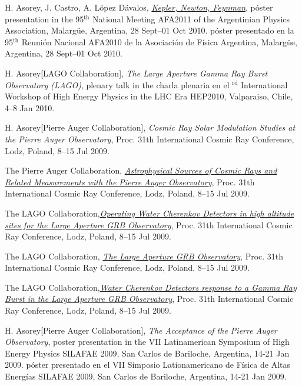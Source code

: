 \begin{etaremune}
\item {}H. Asorey, J. Castro, A. López Dávalos,
\href{http://95rnf.afa.webfactional.com/tex\_files/Resumenes/EF/asorey.pdf}{\emph{Kepler,
Newton, Feynman}}, 
\ifeng
póster presentation in the 95$^{\mathrm{th}}$ National Meeting AFA2011 of the Argentinian Physics Association, Malargüe, Argentina, 28 Sept--01 Oct 2010.
\else
póster presentado en la 95$^{\mathrm{th}}$ Reunión Nacional AFA2010 de la Asociación de Física Argentina, Malargüe, Argentina, 28 Sept--01 Oct 2010.
\fi

\item {}H. Asorey[LAGO Collaboration], {\emph{The Large Aperture Gamma Ray Burst Observatory (LAGO)}}, 
\ifeng
plenary talk in the 
\else
charla plenaria en el 
$^{\mathrm{rd}}$ International Workshop of High Energy Physics in the LHC Era HEP2010, Valparaiso, Chile, 4--8 Jan 2010.

\item {}H. Asorey[Pierre Auger Collaboration], {\emph{Cosmic Ray Solar
Modulation Studies at the Pierre Auger Observatory}}, \en Proc. 31th
International Cosmic Ray Conference, Lodz, Poland, 8--15 Jul 2009.

\item {}The Pierre Auger Collaboration,
\href{http://arxiv.org/abs/0906.2347}{\emph{Astrophysical Sources of Cosmic
Rays and Related Measurements with the Pierre Auger Observatory}}, \en Proc.
31th International Cosmic Ray Conference, Lodz, Poland, 8--15 Jul 2009.

\item {}The LAGO Collaboration,\href{http://arxiv.org/abs/0906.0814}{\emph{Operating Water Cherenkov Detectors in high altitude sites for the Large Aperture GRB Observatory}}, \en Proc. 31th International Cosmic Ray Conference, Lodz, Poland, 8--15 Jul 2009.

\item {}The LAGO Collaboration,
\href{http://arxiv.org/abs/0906.0816}{\emph{The Large Aperture GRB
Observatory}}, \en Proc. 31th International Cosmic Ray Conference, Lodz,
Poland, 8--15 Jul 2009.

\item {}The LAGO Collaboration,\href{http://arxiv.org/abs/0906.0820}{\emph{Water Cherenkov Detectors response to a Gamma Ray Burst in the Large Aperture GRB Observatory}}, \en Proc. 31th International Cosmic Ray Conference, Lodz, Poland, 8--15 Jul 2009.
\item {}H. Asorey[Pierre Auger Collaboration], {\emph{The Acceptance of the
Pierre Auger Observatory}}, 
\ifeng
poster presentation in the VII Latinamerican Symposium of High Energy Physics SILAFAE 2009, San Carlos de Bariloche, Argentina, 14-21 Jan 2009.
\else
póster presentado en el VII Simposio Lationamericano de Física de Altas Energías SILAFAE 2009, San Carlos de Bariloche, Argentina, 14-21 Jan 2009.
\fi


\end{etaremune}

